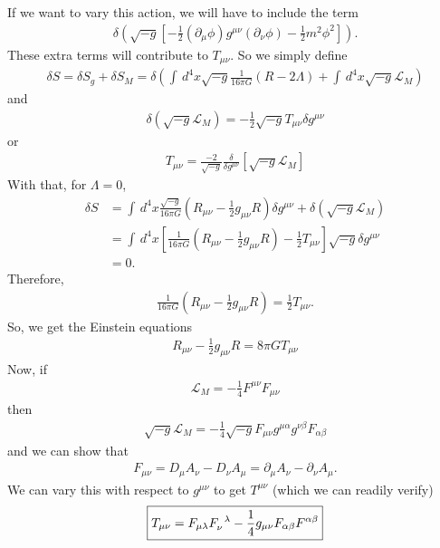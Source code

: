 \documentclass[a4paper,11pt]{article}
\numberwithin{equation}{section}
\theoremstyle{definition}
\newcommand{\p}{\partial}
\newcommand{\lag}{\mathcal{L}}
\newcommand{\nn}{\nonumber}
\newcommand{\f}[2]{\frac{#1}{#2}}
\newcommand{\lp}{\left(}
\newcommand{\rp}{\right)}
\newcommand{\lb}{\left[}
\newcommand{\rb}{\right]}
\begin{document}
If we want to vary this action, we will have to include the term
\begin{align}
\delta \lp \sqrt{-g}\lb -\f{1}{2}(\p_\mu\phi)g^{\mu\nu}(\p_\nu\phi) - \f{1}{2}m^2\phi^2 \rb \rp.
\end{align}
These extra terms will contribute to $T_{\mu\nu}$. So we simply define
\begin{align}
\delta S = \delta S_g+ \delta S_M = \delta \lp\int\,d^4x \sqrt{-g}\f{1}{16\pi G}(R - 2\Lambda) + \int\,d^4x \sqrt{-g}\lag_M\rp
\end{align}
and 
\begin{align}
\boxed{\delta \lp \sqrt{-g}\lag_M \rp = -\f{1}{2}\sqrt{-g}T_{\mu\nu}\delta g^{\mu\nu}}
\end{align}
or
\begin{align}
\boxed{T_{\mu\nu} = \f{-2}{\sqrt{-g}}\f{\delta}{\delta g^{\mu\nu}} \lb \sqrt{-g}\lag_M \rb }
\end{align}
With that, for $\Lambda = 0$,
\begin{align}
\delta S &= \int\,d^4x \f{\sqrt{-g}}{16\pi G}\lp R_{\mu\nu} - \f{1}{2}g_{\mu\nu}R \rp \delta g^{\mu\nu} + \delta(\sqrt{-g}\lag_M)\nn\\
&= \int\,d^4x \lb \f{1}{16\pi G}\lp R_{\mu\nu} - \f{1}{2}g_{\mu\nu}R \rp - \f{1}{2}T_{\mu\nu} \rb\sqrt{-g}\delta g^{\mu\nu}\nn\\
&= 0.
\end{align}
Therefore,
\begin{align}
\f{1}{16\pi G}\lp R_{\mu\nu} - \f{1}{2}g_{\mu\nu}R \rp = \f{1}{2}T_{\mu\nu}.
\end{align}
So, we get the Einstein equations
\begin{align}
\boxed{R_{\mu\nu} - \f{1}{2}g_{\mu\nu}R = 8\pi G T_{\mu\nu}}
\end{align}
Now, if 
\begin{align}
\lag_M = -\f{1}{4}F^{\mu\nu}F_{\mu\nu}
\end{align}
then 
\begin{align}\label{em}
\sqrt{-g}\lag_M = -\f{1}{4}\sqrt{-g}F_{\mu\nu}g^{\mu\alpha}g^{\nu\beta}F_{\alpha\beta}
\end{align}
and we can show that
\begin{align}
F_{\mu\nu} = D_{\mu}A_\nu - D_\nu A_\mu = \p_\mu A_\nu - \p_\nu A_\mu.
\end{align}
We can vary this with respect to $g^{\mu\nu}$ to get $T^{\mu\nu}$ (which we can readily verify)
\begin{align}\label{stress}
\boxed{T_{\mu\nu} = F_{\mu\lambda}\tensor{F}{_\nu^\lambda} - \f{1}{4}g_{\mu\nu}F_{\alpha\beta}F^{\alpha\beta}}
\end{align}
\end{document}
